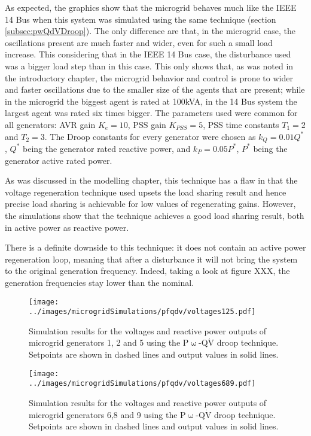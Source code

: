 	As expected, the graphics show that the microgrid behaves much like the IEEE 14 Bus when this system was simulated using the same technique (section \ref{subsec:pwQdVDroop}). The only difference are that, in the microgrid case, the oscillations present are much faster and wider, even for such a small load increase. This considering that in the IEEE 14 Bus case, the disturbance used was a bigger load step than in this case. This only shows that, as was noted in the introductory chapter, the microgrid behavior and control is prone to wider and faster oscillations due to the smaller size of the agents that are present; while in the microgrid the biggest agent is rated at 100kVA, in the 14 Bus system the largest agent was rated six times bigger. The parameters used were common for all generators: AVR gain $K_e = 10$, PSS gain $K_{PSS} = 5$, PSS time constants $T_1 = 2$ and $T_2 = 3$. The Droop constants for every generator were chosen as $k_{Q} = 0.01Q^* $, $Q^*$ being the generator rated reactive power, and $k_P = 0.05P^*$, $P^*$ being the generator active rated power.

	As was discussed in the modelling chapter, this technique has a flaw in that the voltage regeneration technique used upsets the load sharing result and hence precise load sharing is achievable for low values of regenerating gains. However, the simulations show that the technique achieves a good load sharing result, both in active power as reactive power.

	There is a definite downside to this technique: it does not contain an active power regeneration loop, meaning that after a disturbance it will not bring the system to the original generation frequency. Indeed, taking a look at figure XXX, the generation frequencies stay lower than the nominal.

\begin{figure}[htb]
	\begin{center}
		\texttt{[image: ../images/microgridSimulations/pfqdv/voltages125.pdf]}
		\caption{Simulation results for the voltages and reactive power outputs of microgrid generators 1, 2 and 5 using the P$\upomega$-Q$\dot{\text{V}}$ droop technique. Setpoints are shown in dashed lines and output values in solid lines.}
		\label{fig:pfqdvVoltages125}
	\end{center}
\end{figure}

\begin{figure}[htb]
	\begin{center}
		\texttt{[image: ../images/microgridSimulations/pfqdv/voltages689.pdf]}
		\caption{Simulation results for the voltages and reactive power outputs of microgrid generators 6,8 and 9 using the P$\upomega$-Q$\dot{\text{V}}$ droop technique. Setpoints are shown in dashed lines and output values in solid lines.}
		\label{fig:pfqdv689}
	\end{center}
\end{figure}

